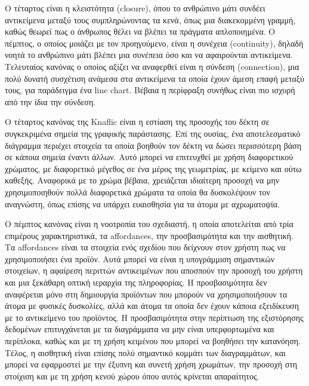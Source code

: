 \documentclass[greek, 12pt]{article}
\begin{document}
Ο τέταρτος είναι η κλειστότητα (closure), όπου το ανθρώπινο μάτι συνδέει αντικείμενα μεταξύ τους συμπληρώνοντας τα κενά, όπως μια διακεκομμένη γραμμή, καθώς θεωρεί πως ο άνθρωπος θέλει να βλέπει τα πράγματα απλοποιημένα. Ο πέμπτος, ο οποίος μοιάζει με τον προηγούμενο, είναι η συνέχεια (continuity), δηλαδή νοητά το ανθρώπινο μάτι βλέπει μια συνέπεια όσο και να αφαιρούνται αντικείμενα. Τελευταίος κανόνας ο οποίος αξίζει να αναφερθεί είναι η σύνδεση (connection), μια πολύ δυνατή συσχέτιση ανάμεσα στα αντικείμενα τα οποία έχουν άμεση επαφή μεταξύ τους, για παράδειγμα ένα line chart. Βέβαια η περίφραξη συνήθως είναι πιο ισχυρή από την ίδια την σύνδεση. \cite{knaflic2015storytelling, wagemans2012century2}

Ο τέταρτος κανόνας της Knaflic είναι η εστίαση της προσοχής του δέκτη σε συγκεκριμένα σημεία της γραφικής παράστασης. Επί της ουσίας, ένα αποτελεσματικό διάγραμμα περιέχει στοιχεία τα οποία βοηθούν τον δέκτη να δώσει περισσότερη βάση σε κάποια σημεία έναντι άλλων. Αυτό μπορεί να επιτευχθεί με χρήση διαφορετικού χρώματος, με διαφορετικό μέγεθος σε ένα μέρος της γεωμετρίας, με κείμενο και ούτω καθεξής. Αναφορικά με το χρώμα βέβαια, χρειάζεται ιδιαίτερη προσοχή να μην χρησιμοποιηθούν πολλά διαφορετικά χρώματα τα οποία θα δυσκολέψουν τον αναγνώστη, όπως επίσης να υπάρχει ευαισθησία για τα άτομα με αχρωματοψία. \cite{knaflic2015storytelling}

Ο πέμπτος κανόνας είναι η νοοτροπία του σχεδιαστή, η οποία αποτελείται από τρία επιμέρους χαρακτηριστικά, τα affordances, την προσβασιμότητα και την αισθητική. Τα affordances \cite{norman2004affordances} είναι τα στοιχεία ενός σχεδίου που δείχνουν στον χρήστη πως να χρησιμοποιήσει ένα προϊόν. Αυτά μπορεί να είναι η υπογράμμιση σημαντικών στοιχείων, η αφαίρεση περιττών αντικειμένων που αποσπούν την προσοχή του χρήστη και μια ξεκάθαρη οπτική ιεραρχία της πληροφορίας. Η προσβασιμότητα δεν αναφέρεται μόνο στη δημιουργία προϊόντων που μπορούν να χρησιμοποιήσουν τα άτομα με φυσικές δυσκολίες, αλλά και άτομα τα οποία δεν έχουν κάποια εξειδίκευση με το αντικείμενο του προϊόντος. Η προσβασιμότητα στην περίπτωση της εξιστόρησης δεδομένων επιτυγχάνεται με τα διαγράμματα να μην είναι υπερφορτωμένα και περίπλοκα, καθώς και με τη χρήση κειμένου που μπορεί να βοηθήσει την κατανόηση. Τέλος, η αισθητική είναι επίσης πολύ σημαντικό κομμάτι των διαγραμμάτων, και μπορεί να εφαρμοστεί με την έξυπνη και συνετή χρήση χρωμάτων, την προσοχή στη στοίχιση και με τη χρήση κενού χώρου όπου αυτός κρίνεται απαραίτητος. \cite{knaflic2015storytelling}
\end{document}
